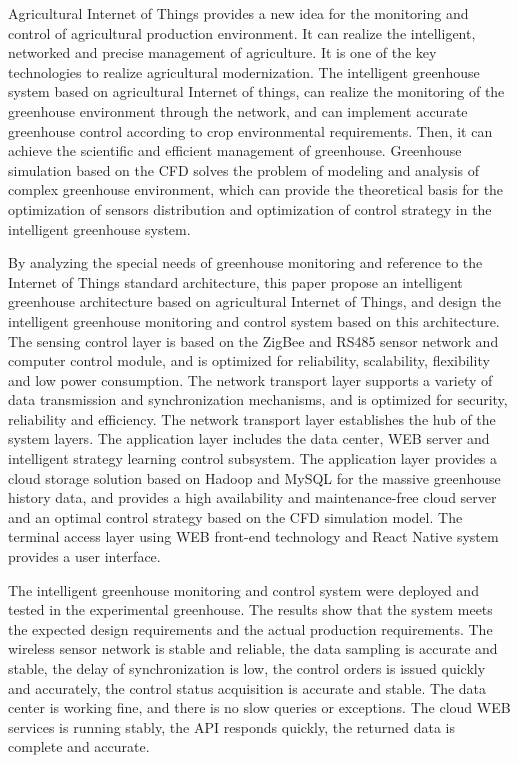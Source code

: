 \begin{englishabstract}

Agricultural Internet of Things provides a new idea for the monitoring and control of agricultural production environment. It can realize the intelligent, networked and precise management of agriculture. It is one of the key technologies to realize agricultural modernization. The intelligent greenhouse system based on agricultural Internet of things, can realize the monitoring  of the greenhouse environment through the network, and can implement accurate greenhouse control according to crop environmental requirements. Then, it can achieve the scientific and efficient management of greenhouse. Greenhouse simulation based on the CFD solves the problem of modeling and analysis of complex greenhouse environment, which can provide the theoretical basis for the optimization of sensors distribution and optimization of control strategy in the intelligent greenhouse system.

By analyzing the special needs of greenhouse monitoring and reference to the Internet of Things standard architecture, this paper propose an intelligent greenhouse architecture based on agricultural Internet of Things, and design the intelligent greenhouse monitoring and control system based on this architecture. The sensing control layer is based on the ZigBee and RS485 sensor network and computer control module, and is optimized for reliability, scalability, flexibility and low power consumption. The network transport layer supports a variety of data transmission and synchronization mechanisms, and is optimized for security, reliability and efficiency. The network transport layer establishes the hub of the system layers. The application layer includes the data center, WEB server and intelligent strategy learning control subsystem. The application layer provides a cloud storage solution based on Hadoop and MySQL for the massive greenhouse history data, and provides a high availability and maintenance-free cloud server and an optimal control strategy based on the CFD simulation model. The terminal access layer using WEB front-end technology and React Native system provides a user interface.

The intelligent greenhouse monitoring and control system were deployed and tested in the experimental greenhouse. The results show that the system meets the expected design requirements and the actual production requirements. The wireless sensor network is stable and reliable, the data sampling is accurate and stable, the delay of synchronization is low, the control orders is issued quickly and accurately, the control status acquisition is accurate and stable. The data center is working fine, and there is no slow queries or exceptions. The cloud WEB services is running stably, the API responds quickly, the returned data is complete and accurate.


\end{englishabstract}
